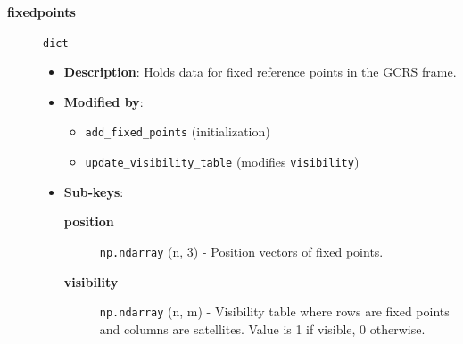 \documentclass[11pt]{article}
\begin{document}
\begin{description}
\item[{\textbf{fixedpoints}}] \texttt{dict}
\begin{itemize}
\item \textbf{Description}: Holds data for fixed reference points in the GCRS frame.
\item \textbf{Modified by}:
\begin{itemize}
\item \texttt{add\_fixed\_points} (initialization)
\item \texttt{update\_visibility\_table} (modifies \texttt{visibility})
\end{itemize}
\item \textbf{Sub-keys}:
\begin{description}
\item[{\textbf{position}}] \texttt{np.ndarray} (n, 3) - Position vectors of fixed points.
\item[{\textbf{visibility}}] \texttt{np.ndarray} (n, m) - Visibility table where rows are fixed points and columns are satellites. Value is 1 if visible, 0 otherwise.
\end{description}
\end{itemize}


\end{description}
\end{document}
